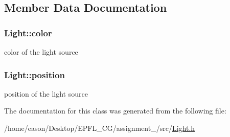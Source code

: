 \subsection{Member Data Documentation}
\subsubsection[{\texorpdfstring{color}{color}}]{ Light\+::color}\hypertarget{structLight_a4de55f2ffad274ae9f37045d975125a4}{}\label{structLight_a4de55f2ffad274ae9f37045d975125a4}


color of the light source 

\subsubsection[{\texorpdfstring{position}{position}}]{ Light\+::position}\hypertarget{structLight_a0d6a0c891a474eedc7d402352becc507}{}\label{structLight_a0d6a0c891a474eedc7d402352becc507}


position of the light source 



The documentation for this class was generated from the following file\+:\begin{DoxyCompactItemize}
\item 
/home/eason/\+Desktop/\+E\+P\+F\+L\+\_\+\+C\+G/assignment\+\_/src/\hyperlink{Light_8h}{Light.\+h}\end{DoxyCompactItemize}
